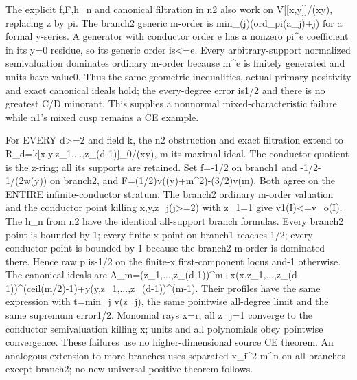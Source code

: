 \documentclass[11pt]{article}
\begin{document}
The explicit f,F,h\_n and canonical filtration in n2 also work on V[[x,y]]/(xy), replacing z by pi. The branch2 generic m-order is min\_(j)(ord\_pi(a\_j)+j) for a formal y-series. A generator with conductor order e has a nonzero pi\textasciicircum{}e coefficient in its y=0 residue, so its generic order is\textless{}=e. Every arbitrary-support normalized semivaluation dominates ordinary m-order because m\textasciicircum{}e is finitely generated and units have value0. Thus the same geometric inequalities, actual primary positivity and exact canonical ideals hold; the every-degree error is1/2 and there is no greatest C/D minorant. This supplies a nonnormal mixed-characteristic failure while n1's mixed cusp remains a CE example.

For EVERY d\textgreater{}=2 and field k, the n2 obstruction and exact filtration extend to R\_d=k[x,y,z\_1,...,z\_(d-1)]\_0/(xy), m its maximal ideal. The conductor quotient is the z-ring; all its supports are retained. Set f=-1/2 on branch1 and -1/2-1/(2w(y)) on branch2, and F=(1/2)v((y)+m\textasciicircum{}2)-(3/2)v(m). Both agree on the ENTIRE infinite-conductor stratum. The branch2 ordinary m-order valuation and the conductor point killing x,y,z\_j(j\textgreater{}=2) with z\_1=1 give v1(I)\textless{}=v\_o(I). The h\_n from n2 have the identical all-support branch formulas. Every branch2 point is bounded by-1; every finite-x point on branch1 reaches-1/2; every conductor point is bounded by-1 because the branch2 m-order is dominated there. Hence raw p is-1/2 on the finite-x first-component locus and-1 otherwise. The canonical ideals are
A\_m=(z\_1,...,z\_(d-1))\textasciicircum{}m+x(x,z\_1,...,z\_(d-1))\textasciicircum{}(ceil(m/2)-1)+y(y,z\_1,...,z\_(d-1))\textasciicircum{}(m-1).
Their profiles have the same expression with t=min\_j v(z\_j), the same pointwise all-degree limit and the same supremum error1/2. Monomial rays x=r, all z\_j=1 converge to the conductor semivaluation killing x; units and all polynomials obey pointwise convergence. These failures use no higher-dimensional source CE theorem. An analogous extension to more branches uses separated x\_i\textasciicircum{}2 m\textasciicircum{}n on all branches except branch2; no new universal positive theorem follows.
\end{document}
